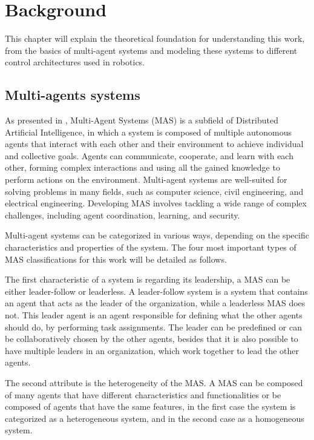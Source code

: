 \def \MOISEp {$\mathcal{M}OISE^+$}
\def \MOISEpBf {$\mathbf{\mathcal{M}OISE^+}$}

\chapter{Background}
\label{ch:background}

This chapter will explain the theoretical foundation for understanding this work, from the basics of multi-agent systems and modeling these systems to different control architectures used in robotics.

\section{Multi-agents systems}

As presented in \cite{MASSurvey}, Multi-Agent Systems (MAS) is a subfield of Distributed Artificial Intelligence, in which a system is composed of multiple autonomous agents that interact with each other and their environment to achieve individual and collective goals. Agents can communicate, cooperate, and learn with each other, forming complex interactions and using all the gained knowledge to perform actions on the environment. Multi-agent systems are well-suited for solving problems in many fields, such as computer science, civil engineering, and electrical engineering. Developing MAS involves tackling a wide range of complex challenges, including agent coordination, learning, and security.

Multi-agent systems can be categorized in various ways, depending on the specific characteristics and properties of the system. The four most important types of MAS classifications for this work will be detailed as follows.

The first characteristic of a system is regarding its leadership, a MAS can be either leader-follow or leaderless. A leader-follow system is a system that contains an agent that acts as the leader of the organization, while a leaderless MAS does not. This leader agent is an agent responsible for defining what the other agents should do, by performing task assignments. The leader can be predefined or can be collaboratively chosen by the other agents, besides that it is also possible to have multiple leaders in an organization, which work together to lead the other agents.

The second attribute is the heterogeneity of the MAS. A MAS can be composed of many agents that have different characteristics and functionalities or be composed of agents that have the same features, in the first case the system is categorized as a heterogeneous system, and in the second case as a homogeneous system.

